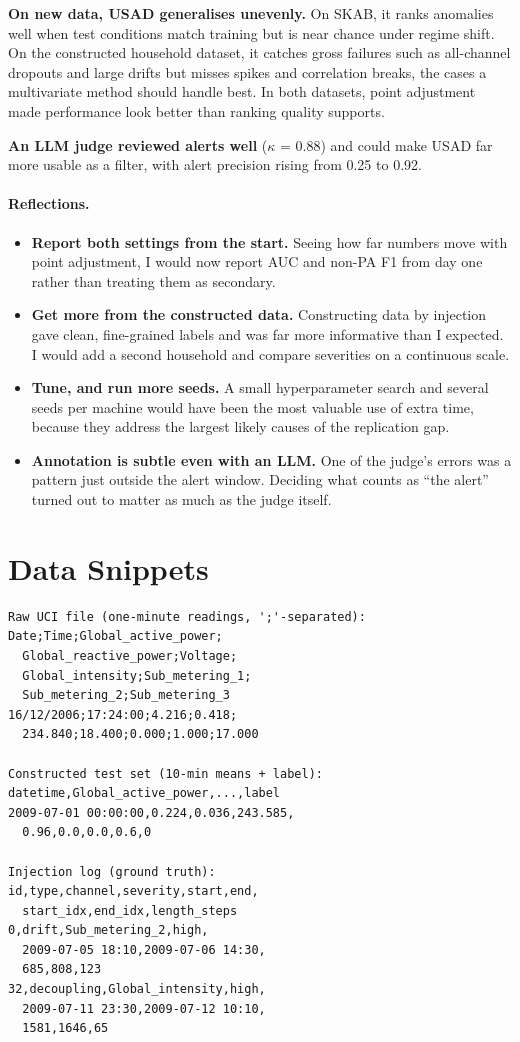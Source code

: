 \documentclass[11pt]{article}
\begin{document}
\textbf{On new data, USAD generalises unevenly.} On SKAB, it ranks anomalies well when test conditions match training but is near chance under regime shift. On the constructed household dataset, it catches gross failures such as all-channel dropouts and large drifts but misses spikes and correlation breaks, the cases a multivariate method should handle best. In both datasets, point adjustment made performance look better than ranking quality supports.

\textbf{An LLM judge reviewed alerts well} ($\kappa$ = 0.88) and could make USAD far more usable as a filter, with alert precision rising from 0.25 to 0.92.

\paragraph{Reflections.}
\begin{itemize}
\item \textbf{Report both settings from the start.} Seeing how far numbers move with point adjustment, I would now report AUC and non-PA F1 from day one rather than treating them as secondary.
\item \textbf{Get more from the constructed data.} Constructing data by injection gave clean, fine-grained labels and was far more informative than I expected. I would add a second household and compare severities on a continuous scale.
\item \textbf{Tune, and run more seeds.} A small hyperparameter search and several seeds per machine would have been the most valuable use of extra time, because they address the largest likely causes of the replication gap.
\item \textbf{Annotation is subtle even with an LLM.} One of the judge's errors was a pattern just outside the alert window. Deciding what counts as ``the alert'' turned out to matter as much as the judge itself.
\end{itemize}



\appendix
\section{Data Snippets}
\label{app:snips}
{\scriptsize
\begin{verbatim}
Raw UCI file (one-minute readings, ';'-separated):
Date;Time;Global_active_power;
  Global_reactive_power;Voltage;
  Global_intensity;Sub_metering_1;
  Sub_metering_2;Sub_metering_3
16/12/2006;17:24:00;4.216;0.418;
  234.840;18.400;0.000;1.000;17.000

Constructed test set (10-min means + label):
datetime,Global_active_power,...,label
2009-07-01 00:00:00,0.224,0.036,243.585,
  0.96,0.0,0.0,0.6,0

Injection log (ground truth):
id,type,channel,severity,start,end,
  start_idx,end_idx,length_steps
0,drift,Sub_metering_2,high,
  2009-07-05 18:10,2009-07-06 14:30,
  685,808,123
32,decoupling,Global_intensity,high,
  2009-07-11 23:30,2009-07-12 10:10,
  1581,1646,65
\end{verbatim}}
\end{document}
